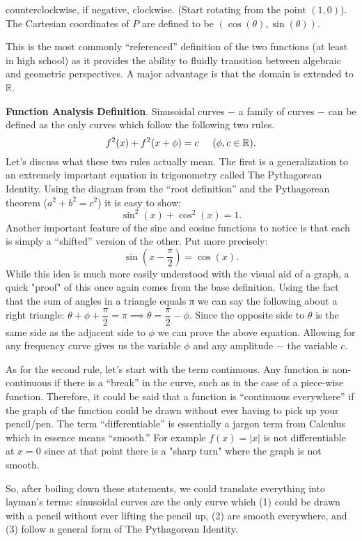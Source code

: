 \documentclass[../book.tex]{subfiles}
\begin{document}
\noindent counterclockwise, if negative, clockwise.  (Start rotating from the point $(1,0)$). The Cartesian coordinates of $P$ are defined to be $(\cos(\theta),\sin(\theta))$.

This is the most commonly “referenced” definition of the two functions (at least in high school) as it provides the ability to fluidly transition between algebraic and geometric perspectives. A major advantage is that the domain is extended to $\mathbb{R}$.

\textbf{Function Analysis Definition}. Sinusoidal curves $-$ a family of curves $-$ can be defined as the only curves which follow the following two rules. $$f^2(x)+f^2(x+\phi)=c \hspace{5mm} (\phi,c\in\mathbb{R}).$$
Let's discuss what these two rules actually mean. The first is a generalization to an extremely important equation in trigonometry called The Pythagorean Identity. Using the diagram from the “root definition” and the Pythagorean theorem ($a^2+b^2=c^2$) it is easy to show: $$\sin^2(x)+\cos^2(x)=1.$$
Another important feature of the sine and cosine functions to notice is that each is simply a “shifted” version of the other. Put more precisely: $$\sin\left(x-\dfrac{\pi}{2}\right)=\cos(x).$$
While this idea is much more easily understood with the visual aid of a graph, a quick "proof" of this once again comes from the base definition. Using the fact that the sum of angles in a triangle equals π we can say the following about a right triangle: $\theta+\phi+\dfrac{\pi}{2}=\pi \implies \theta=\dfrac{\pi}{2}-\phi$. Since the opposite side to $\theta$ is the same side as the adjacent side to $\phi$ we can prove the above equation. Allowing for any frequency curve gives us the variable $\phi$ and any amplitude $-$ the variable $c$.

As for the second rule, let's start with the term continuous. Any function is non-continuous if there is a “break” in the curve, such as in the case of a piece-wise function. Therefore, it could be said that a function is “continuous everywhere” if the graph of the function could be drawn without ever having to pick up your pencil/pen. The term “differentiable” is essentially a jargon term from Calculus which in essence means “smooth.” For example $f(x)=|x|$ is not differentiable at $x=0$ since at that point there is a "sharp turn" where the graph is not smooth.

So, after boiling down these statements, we could translate everything into layman's terms: sinusoidal curves are the only curve which (1) could be drawn with a pencil without ever lifting the pencil up, (2) are smooth everywhere, and (3) follow a general form of The Pythagorean Identity.
\end{document}

